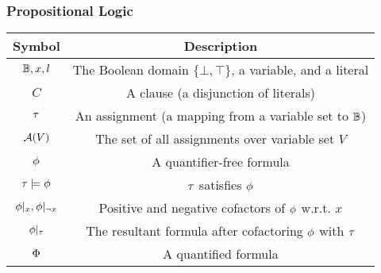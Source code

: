\begin{frame}
      \frametitle{Propositional Logic}
      \begin{table}[t]
            \centering
            \begin{tabular}{c|c}
                  Symbol                      & Description                                                   \\
                  \hline
                  $\mathbb{B},x,l$              & The Boolean domain $\{\bot,\top\}$, a variable, and a literal \\
                  $C$                         & A clause (a disjunction of literals)                          \\
                  $\tau$                       & An assignment (a mapping from a variable set to $\mathbb{B}$)   \\
                  $\mathcal{A}(V)$                    & The set of all assignments over variable set $V$              \\
                  $\phi$                       & A quantifier-free formula                                     \\
                  $\tau\models\phi$             & $\tau$ satisfies $\phi$                                         \\
                  $\phi|_{x},\phi|_{\lnot x}$ & Positive and negative cofactors of $\phi$ w.r.t. $x$           \\
                  $\phi|_{\tau}$            & The resultant formula after cofactoring $\phi$ with $\tau$      \\
                  $\Phi$                       & A quantified formula                                          \\
            \end{tabular}
      \end{table}
\end{frame}